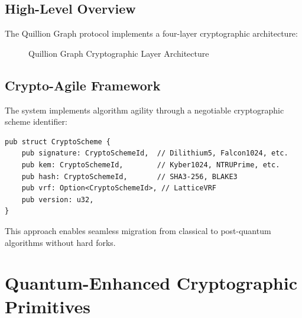 \documentclass[12pt,a4paper]{article}
\begin{document}
\subsection{High-Level Overview}

The Quillion Graph protocol implements a four-layer cryptographic architecture:

\begin{figure}[h]
\centering
{}
\caption{Quillion Graph Cryptographic Layer Architecture}
\end{figure}

\subsection{Crypto-Agile Framework}

The system implements algorithm agility through a negotiable cryptographic scheme identifier:

\begin{lstlisting}[style=rustcode, caption=Crypto-Agile Scheme Configuration]
pub struct CryptoScheme {
    pub signature: CryptoSchemeId,  // Dilithium5, Falcon1024, etc.
    pub kem: CryptoSchemeId,        // Kyber1024, NTRUPrime, etc.
    pub hash: CryptoSchemeId,       // SHA3-256, BLAKE3
    pub vrf: Option<CryptoSchemeId>, // LatticeVRF
    pub version: u32,
}
\end{lstlisting}

This approach enables seamless migration from classical to post-quantum algorithms without hard forks.

\section{Quantum-Enhanced Cryptographic Primitives}
\end{document}
